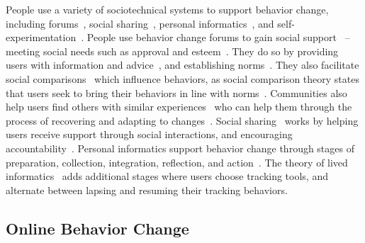 People use a variety of sociotechnical systems to support behavior change, including forums~\cite{eysenbach2004health, chancellornorms}, social sharing~\cite{poirier2012social, Chung:2016:BNA:2818048.2819926, pina2017personal, Ko:2015:NGI:2675133.2675244}, personal informatics~\cite{li2010stage, Chung:2017:PTB:3025453.3025747}, and self-experimentation~\cite{Karkar:2017:TFS:3025453.3025480}. People use behavior change forums to gain social support~\cite{hong2012outcomes} -- meeting social needs such as approval and esteem~\cite{kaplan1977social}. They do so by providing users with information and advice~\cite{hong2012outcomes}, and establishing norms~\cite{chancellornorms}. They also facilitate social comparisons~\cite{davison2000talks} which influence behaviors, as social comparison theory states that users seek to bring their behaviors in line with norms~\cite{festinger1954theory}. Communities also help users find others with similar experiences~\cite{huh2014health} who can help them through the process of recovering and adapting to changes~\cite{newman2011s}. Social sharing~\cite{poirier2012social, richardson2010online} works by helping users receive support through social interactions, and encouraging accountability~\cite{epstein2015nobody}. Personal informatics support behavior change through stages of preparation, collection, integration, reflection, and action~\cite{li2010stage}. The theory of lived informatics~\cite{epstein2015lived} adds additional stages where users choose tracking tools, and alternate between lapsing and resuming their tracking behaviors. %



\subsection{Online Behavior Change}

